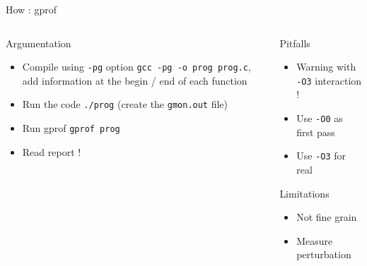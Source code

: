 %
\begin{Frame}{How : gprof}
  \begin{columns}[t]
    \begin{column}{5cm} %
      \begin{block}{Argumentation}
        \begin{itemize}
        \item Compile using \texttt{-pg} option
          \texttt{gcc -pg -o prog prog.c}, add information at the
          begin / end of each function
        \item Run the code \texttt{./prog}
          (create the \texttt{gmon.out} file)
        \item Run gprof \texttt{gprof prog}
        \item Read report !
        \end{itemize}
      \end{block} 
    \end{column}
    
    \begin{column}{5cm} %
      \begin{block}{Pitfalls}
        \begin{itemize}
        \item Warning with \texttt{-O3} interaction !
        \item Use \texttt{-O0} as first pass
        \item Use \texttt{-O3} for real
        \end{itemize}
      \end{block}   
      \begin{alertblock}{Limitations}
        \begin{itemize}
        \item Not fine grain
        \item Measure perturbation
        \end{itemize}
      \end{alertblock}
    \end{column}
  \end{columns}  
\end{Frame}


